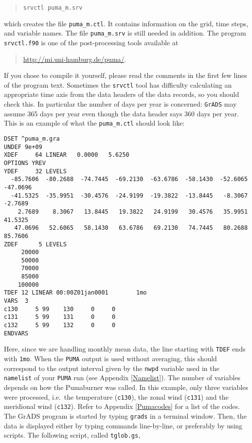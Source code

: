 \begin{quote}
\verb#srvctl puma_m.srv#
\end{quote}
\noindent which creates the file \verb/puma_m.ctl/. 
It contains information on the grid, time steps, and variable names. The file
\verb/puma_m.srv/ is still needed in addition.
The program
\verb#srvctl.f90# is one of the post-processing tools available at
\begin{quote}
{\url{http://mi.uni-hamburg.de/puma/}}.
\end{quote}
If you chose to compile it yourself, please read the comments in the
first few lines of the program text. Sometimes the
\verb/srvctl/ tool has difficulty calculating an appropriate time axis 
from the data headers of the data records, so you should check this. 
In particular the number of days per year is concerned: \verb#GrADS# may assume 365
days per year even though the data header says 360 days per year.
This is an example of what the \verb/puma_m.ctl/ should look like:
\begin{verbatim}
DSET ^puma_m.gra
UNDEF 9e+09
XDEF     64 LINEAR   0.0000   5.6250
OPTIONS YREV
YDEF     32 LEVELS 
  -85.7606  -80.2688  -74.7445  -69.2130  -63.6786  -58.1430  -52.6065  -47.0696
  -41.5325  -35.9951  -30.4576  -24.9199  -19.3822  -13.8445   -8.3067   -2.7689
    2.7689    8.3067   13.8445   19.3822   24.9199   30.4576   35.9951   41.5325
   47.0696   52.6065   58.1430   63.6786   69.2130   74.7445   80.2688   85.7606
ZDEF      5 LEVELS 
     20000
     50000
     70000
     85000
    100000
TDEF 12 LINEAR 00:00Z01jan0001        1mo
VARS  3
c130     5 99    130     0     0
c131     5 99    131     0     0
c132     5 99    132     0     0
ENDVARS
\end{verbatim}
Here, since we are handling monthly mean data, the line starting 
with \verb/TDEF/ ends with \verb/1mo/. When the \verb/PUMA/ output is used
without averaging, this should correspond to the output interval given
by the \verb#nwpd# variable used in the \verb#namelist# of your \verb#PUMA#
run (see Appendix \ref{Namelist}). The number of variables
depends on how the Pumaburner was
called. In this example, only three variables were processed, i.e.\ the
temperature (\verb/c130/), the zonal wind (\verb/c131/) and the meridional 
wind (\verb/c132/). Refer to Appendix \ref{Pumacodes} for a list of the codes.
\\
The GrADS program is started by typing \verb/grads/ in a terminal window. 
Then, the data is displayed either by typing commands line-by-line, 
or preferably by using scripts. The following script, called \verb/tglob.gs/, 
